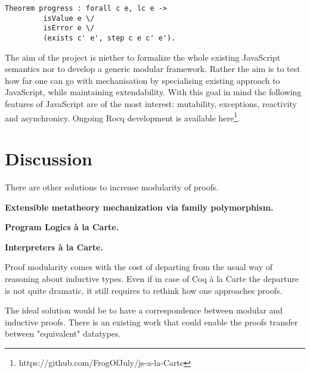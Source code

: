 \documentclass[sigplan,nonacm]{acmart}
\begin{document}
\begin{lstlisting}[numbers=none, language=Coq]
Theorem progress : forall c e, lc e -> 
         isValue e \/ 
         isError e \/ 
         (exists c' e', step c e c' e').
\end{lstlisting}

The aim of the project is niether to formalize the whole existing JavaScript semantics nor to develop a generic modular framework. 
Rather the aim is to test how far one can go with mechanisation by specialising existing approach to JavaScript, while maintaining extendability. 
With this goal in mind the following features of JavaScript are of the most interest: mutability, exceptions, reactivity and asynchronicy. 
Ongoing Rocq development is available here\footnote{https://github.com/FrogOfJuly/js-a-la-Carte}.


\section{Discussion}

There are other solutions to increase modularity of proofs. 

\medskip

\textbf{Extensible metatheory mechanization via family polymorphism.}


\medskip
\textbf{Program Logics à la Carte.}



\medskip
\textbf{Interpreters à la Carte.}


\medskip




Proof modularity comes with the cost of departing from the usual way of reasoning about inductive types. 
Even if in case of Coq à la Carte the departure is not quite dramatic, it still requires to rethink how one approaches proofs.

The ideal solution would be to have a correspondence between modular and inductive proofs. 
There is an existing work\cite{cohen2024trocq} that could enable the proofs transfer between "equivalent" datatypes. 







\appendix
\end{document}
